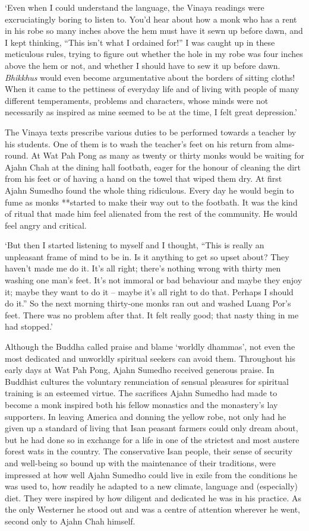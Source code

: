 `Even when I could understand the language, the Vinaya readings were
excruciatingly boring to listen to. You'd hear about how a monk who has a
rent in his robe so many inches above the hem must have it sewn up
before dawn, and I kept thinking, ``This isn't what I ordained for!'' I
was caught up in these meticulous rules, trying to figure out whether
the hole in my robe was four inches above the hem or not, and whether I
should have to sew it up before dawn. \emph{Bhikkhus} would even become
argumentative about the borders of sitting cloths! When it came to the
pettiness of everyday life and of living with people of many different
temperaments, problems and characters, whose minds were not necessarily
as inspired as mine seemed to be at the time, I felt great depression.'

The Vinaya texts prescribe various duties to be performed towards a
teacher by his students. One of them is to wash the teacher's feet on
his return from alms-round. At Wat Pah Pong as many as twenty or thirty
monks would be waiting for Ajahn Chah at the dining hall footbath, eager
for the honour of cleaning the dirt from his feet or of having a hand on
the towel that wiped them dry. At first Ajahn Sumedho found the whole
thing ridiculous. Every day he would begin to fume as monks **started to
make their way out to the footbath. It was the kind of ritual that made
him feel alienated from the rest of the community. He would feel angry
and critical. 

`But then I started listening to myself and I thought, 
``This is really an unpleasant frame of mind to be in. Is it anything to
get so upset about? They haven't made me do it. It's all right; there's
nothing wrong with thirty men washing one man's feet. It's not immoral
or bad behaviour and maybe they enjoy it; maybe they want to do it --
maybe it's all right to do that. Perhaps I should do it.'' So the next
morning thirty-one monks ran out and washed Luang Por's feet. There was
no problem after that. It felt really good; that nasty thing in me had
stopped.'

Although the Buddha called praise and blame `worldly dhammas', not even
the most dedicated and unworldly spiritual seekers can avoid them. 
Throughout his early days at Wat Pah Pong, Ajahn Sumedho received
generous praise. In Buddhist cultures the voluntary renunciation of
sensual pleasures for spiritual training is an esteemed virtue. The
sacrifices Ajahn Sumedho had made to become a monk inspired both his
fellow monastics and the monastery's lay supporters. In leaving America
and donning the yellow robe, not only had he given up a standard of
living that Isan peasant farmers could only dream about, but he had done
so in exchange for a life in one of the strictest and most austere
forest wats in the country. The conservative Isan people, their sense of
security and well-being so bound up with the maintenance of their
traditions, were impressed at how well Ajahn Sumedho could live in exile
from the conditions he was used to, how readily he adapted to a new
climate, language and (especially) diet. They were inspired by how
diligent and dedicated he was in his practice. As the only Westerner he
stood out and was a centre of attention wherever he went, second only to
Ajahn Chah himself. 

